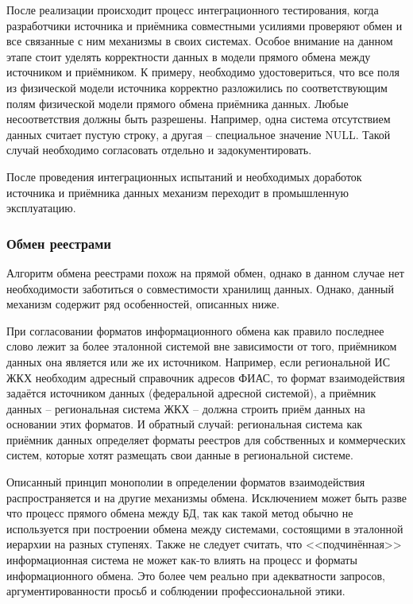 После реализации происходит процесс интеграционного тестирования, когда разработчики источника и приёмника совместными усилиями проверяют обмен и все связанные с ним механизмы в своих системах.
Особое внимание на данном этапе стоит уделять корректности данных в модели прямого обмена между источником и приёмником.
К примеру, необходимо удостовериться, что все поля из физической модели источника корректно разложились по соответствующим полям физической модели прямого обмена приёмника данных.
Любые несоответствия должны быть разрешены.
Например, одна система отсутствием данных считает пустую строку, а другая -- специальное значение NULL.
Такой случай необходимо согласовать отдельно и задокументировать.

После проведения интеграционных испытаний и необходимых доработок источника и приёмника данных механизм переходит в промышленную эксплуатацию.

\subsubsection{Обмен реестрами}

Алгоритм обмена реестрами похож на прямой обмен, однако в данном случае нет необходимости заботиться о совместимости хранилищ данных.
Однако, данный механизм содержит ряд особенностей, описанных ниже.

При согласовании форматов информационного обмена как правило последнее слово лежит за более эталонной системой вне зависимости от того, приёмником данных она является или же их источником.
Например, если региональной ИС ЖКХ необходим адресный справочник адресов ФИАС, то формат взаимодействия задаётся источником данных (федеральной адресной системой), а приёмник данных -- региональная система ЖКХ -- должна строить приём данных на основании этих форматов.
И обратный случай: региональная система как приёмник данных определяет форматы реестров для собственных и коммерческих систем, которые хотят размещать свои данные в региональной системе.

Описанный принцип монополии в определении форматов взаимодействия распространяется и на другие механизмы обмена.
Исключением может быть разве что процесс прямого обмена между БД, так как такой метод обычно не используется при построении обмена между системами, состоящими в эталонной иерархии на разных ступенях.
Также не следует считать, что <<подчинённая>> информационная система не может как-то влиять на процесс и форматы информационного обмена.
Это более чем реально при адекватности запросов, аргументированности просьб и соблюдении профессиональной этики.

